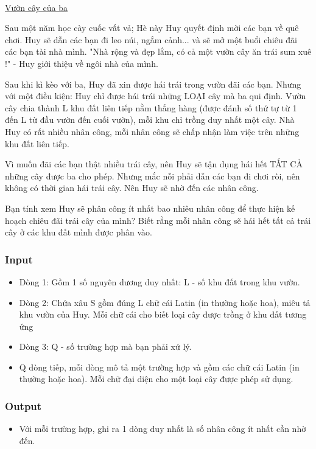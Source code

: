

 

\href{https://www.youtube.com/watch?v=WBJMeGgAmY8}{Vườn cây của ba }

Sau một năm học cày cuốc vất vả; Hè này Huy quyết định mời các bạn về quê chơi. Huy sẽ dẫn các bạn đi leo núi, ngắm cảnh... và sẽ mở một buổi chiêu đãi các bạn tài nhà mình. "Nhà rộng và đẹp lắm, có cả một vườn cây ăn trái sum xuê !" - Huy giới thiệu về ngôi nhà của mình.

Sau khi kì kèo với ba, Huy đã xin được hái trái trong vườn đãi các bạn. Nhưng với một điều kiện: Huy chỉ được hái trái những LOẠI cây mà ba qui định. Vườn cây chia thành L khu đất liên tiếp nằm thẳng hàng (được đánh số thứ tự từ 1 đến L từ đầu vườn đến cuối vườn), mỗi khu chỉ trồng duy nhất một cây. Nhà Huy có rất nhiều nhân công, mỗi nhân công sẽ chấp nhận làm việc trên những khu đất liên tiếp.

Vì muốn đãi các bạn thật nhiều trái cây, nên Huy sẽ tận dụng hái hết TẤT CẢ những cây được ba cho phép. Nhưng mắc nỗi phải dẫn các bạn đi chơi ròi, nên không có thời gian hái trái cây. Nên Huy sẽ nhờ đến các nhân công.

Bạn tính xem Huy sẽ phân công ít nhất bao nhiêu nhân công để thực hiện kế hoạch chiêu đãi trái cây của mình? Biết rằng mỗi nhân công sẽ hái hết tất cả trái cây ở các khu đất mình được phân vào.

\subsubsection{Input}
\begin{itemize}
	\item Dòng 1: Gồm 1 số nguyên dương duy nhất: L - số khu đất trong khu vườn.
	\item Dòng 2: Chứa xâu S gồm đúng L chữ cái Latin (in thường hoặc hoa), miêu tả khu vườn của Huy. Mỗi chữ cái cho biết loại cây được trồng ở khu đất tương ứng
	\item Dòng 3: Q - số trường hợp mà bạn phải xứ lý.
	\item Q dòng tiếp, mỗi dòng mô tả một trường hợp và gồm các chữ cái Latin (in thường hoặc hoa). Mỗi chữ đại diện cho một loại cây được phép sử dụng.
\end{itemize}

\subsubsection{Output}
\begin{itemize}
	\item Với mỗi trường hợp, ghi ra 1 dòng duy nhất là số nhân công ít nhất cần nhờ đến.
\end{itemize}

